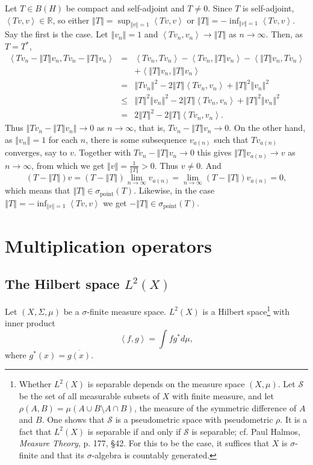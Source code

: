 \documentclass{article}
\newcommand{\inner}[2]{\left\langle #1, #2 \right\rangle}
\newcommand{\point}{\sigma_{\textrm{point}}}
\newcommand{\norm}[1]{\left\Vert #1 \right\Vert}
\begin{document}
Let $T \in B(H)$ be compact and self-adjoint and $T \neq 0$.
Since $T$ is self-adjoint, $\inner{Tv}{v} \in \mathbb{R}$, so either $\norm{T}=\sup_{\norm{v}=1} \inner{Tv}{v}$ or
$\norm{T}=-\inf_{\norm{v}=1} \inner{Tv}{v}$. Say the first is the case. Let $\norm{v_n}=1$ and $\inner{Tv_n}{v_n} \to \norm{T}$ as
$n \to \infty$. Then, as $T=T^*$,
\begin{eqnarray*}
\inner{Tv_n-\norm{T}v_n}{Tv_n-\norm{T}v_n}&=&\inner{Tv_n}{Tv_n}-\inner{Tv_n}{\norm{T}v_n}-\inner{\norm{T}v_n}{Tv_n}\\
&&+\inner{\norm{T}v_n}{\norm{T}v_n}\\
&=&\norm{Tv_n}^2-2\norm{T}\inner{Tv_n}{v_n}+\norm{T}^2 \norm{v_n}^2\\
&\leq&\norm{T}^2 \norm{v_n}^2-2\norm{T}\inner{Tv_n}{v_n}+\norm{T}^2 \norm{v_n}^2\\
&=&2\norm{T}^2-2\norm{T}\inner{Tv_n}{v_n}.
\end{eqnarray*}
Thus $\norm{Tv_n-\norm{T}v_n} \to 0$ as $n \to \infty$, that is, $Tv_n - \norm{T}v_n \to 0$. On the other hand, as $\norm{v_n}=1$ for each $n$, there is some subsequence
$v_{a(n)}$ such that $Tv_{a(n)}$ converges, say to $v$. Together with $Tv_n -\norm{T}v_n \to 0$ this gives
$\norm{T}v_{a(n)} \to v$ as $n \to \infty$, from which we get $\norm{v}=\frac{1}{\norm{T}}>0$. Thus $v \neq 0$. And
\[
(T-\norm{T})v=(T-\norm{T})\lim_{n \to \infty} v_{a(n)} = \lim_{n \to \infty} (T-\norm{T}) v_{a(n)} = 0,
\]
which means that $\norm{T} \in \point(T)$. Likewise, in the case $\norm{T}=-\inf_{\norm{v}=1} \inner{Tv}{v}$ we get
$-\norm{T} \in \point(T)$.

\section{Multiplication operators}
\subsection{The Hilbert space $L^2(X)$}
Let $(X,\Sigma,\mu)$ be a $\sigma$-finite measure space. $L^2(X)$ is a Hilbert space\footnote{Whether
 $L^2(X)$ is separable depends on the measure space $(X,\mu)$. Let $\mathscr{S}$ be the set of all measurable subsets
 of $X$ with finite measure, and let $\rho(A,B)=\mu(A \cup B \setminus A \cap B)$, the measure
 of the symmetric difference of $A$ and $B$. One shows that $\mathscr{S}$ is a pseudometric space with pseudometric $\rho$. It is a fact
 that $L^2(X)$ is separable if and only if $\mathscr{S}$ is separable; cf. Paul Halmos, {\em Measure Theory},
 p. 177, \S 42. For this to be the case, it suffices that $X$ is $\sigma$-finite and that its $\sigma$-algebra
 is countably generated.} with inner product
\[
\inner{f}{g}=\int f g^* d\mu,
\]
where $g^*(x)=\overline{g(x)}$.
\end{document}
